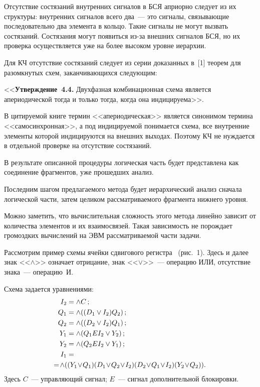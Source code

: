 \begin{multicols}{2}
  Отсутствие состязаний внутренних сигналов в БСЯ априорно следует из их
структуры: внутренних сигналов всего два~--- это сигналы, свя\-зы\-ва\-ющие
последовательно два элемента в кольцо. Такие сигналы не могут вызвать
состязаний. Состязания могут появиться из-за внешних сигналов БСЯ, но их
проверка осуществляется уже на более высоком уровне иерархии.

  Для КЧ отсутствие состязаний следует из серии доказанных в~[1] теорем для
разомкнутых схем, заканчивающихся следующим:

  <<\textbf{Утверждение~4.4.} Двухфазная комбинационная схема является
апериодической тогда и только тогда, когда она индицируема>>.

  В цитируемой книге термин <<апериодическая>> является синонимом
термина <<самосинхронная>>, а под индицируемой понимается схема, все
внутренние элементы которой индицируются на внешних выходах. Поэтому КЧ
не нуждается в отдельной проверке на отсутствие состязаний.

  В результате описанной процедуры логическая часть будет представлена как
соединение фрагментов, уже прошедших анализ.

  Последним шагом предлагаемого метода будет иерархический анализ сначала
логической части, затем целиком рассматриваемого фрагмента нижнего уровня.

  Можно заметить, что вычислительная сложность этого метода линейно
зависит от количества элементов и их взаимосвязей. Такая зависимость не
порождает громоздких вычислений на ЭВМ рассматриваемой части задачи.

  Рассмотрим пример схемы ячейки сдвигового регистра~\cite{18-p} (рис.~1).
  Здесь и далее знак <<$\wedge$>> означает отрицание, знак <<$\vee$>>~---
операцию ИЛИ, отсутствие знака~--- операцию~И.

  Схема задается уравнениями:
  \begin{align}
  I_2&= \wedge C\,;\label{e1-p}\\
  Q_1 &= \wedge ((D_1 \vee I_2) Q_2)\,;
  \label{e2-p}\\
  Q_2 &= \wedge ((D_2 \vee I_2) Q_1)\,;
  \label{e3-p}\\
  Y_1 & = \wedge (Q_1 E I_2 \vee Y_2)\,;
  \label{e4-p}\\
  Y_2& = \wedge (Q_2 E I_2 \vee Y_1)\,;
  \label{e5-p}\\
  I_1& = \notag\\
&\hspace*{-7.5mm}=\!\wedge ((Y_1 \!\vee\! Q_1) (D_1\!\vee\!Q_2\!\vee\!I_2)
(D_2\!\vee\!Q_1\!\vee\!I_2) (Y_2\!\vee\!Q_2)).\!\!\!
  \label{e6-p}
  \end{align}
  Здесь $C$~--- управляющий сигнал; $E$~--- сигнал дополнительной
блокировки.


\end{multicols}
